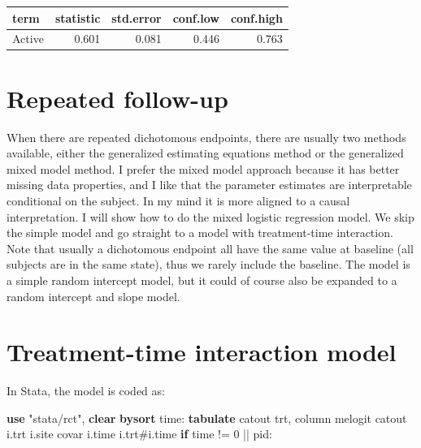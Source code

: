\documentclass[
]{book}
\newenvironment{Shaded}{\begin{snugshade}}{\end{snugshade}}
\newcommand{\KeywordTok}[1]{\textcolor[rgb]{0.13,0.29,0.53}{\textbf{#1}}}
\newcommand{\NormalTok}[1]{#1}
\newcommand{\StringTok}[1]{\textcolor[rgb]{0.31,0.60,0.02}{#1}}
\begin{document}
\begin{tabular}{l|r|r|r|r}
\hline
term & statistic & std.error & conf.low & conf.high\\
\hline
Active & 0.601 & 0.081 & 0.446 & 0.763\\
\hline
\end{tabular}

\section{Repeated follow-up}\label{repeated-follow-up-1}

When there are repeated dichotomous endpoints, there are usually two methods available, either the generalized estimating equations method or the generalized mixed model method. I prefer the mixed model approach because it has better missing data properties, and I like that the parameter estimates are interpretable conditional on the subject. In my mind it is more aligned to a causal interpretation. I will show how to do the mixed logistic regression model. We skip the simple model and go straight to a model with treatment-time interaction. Note that usually a dichotomous endpoint all have the same value at baseline (all subjects are in the same state), thus we rarely include the baseline. The model is a simple random intercept model, but it could of course also be expanded to a random intercept and slope model.

\section{Treatment-time interaction model}\label{treatment-time-interaction-model}

In Stata, the model is coded as:

\begin{Shaded}
\begin{Highlighting}[]
\KeywordTok{use} \StringTok{"stata/rct"}\NormalTok{, }\KeywordTok{clear} 
\KeywordTok{bysort}\NormalTok{ time: }\KeywordTok{tabulate}\NormalTok{ catout trt, column}
\NormalTok{melogit catout i.trt i.site covar i.time i.trt\#i.time }\KeywordTok{if}\NormalTok{ time != 0 || pid: }
\end{Highlighting}
\end{Shaded}
\end{document}
